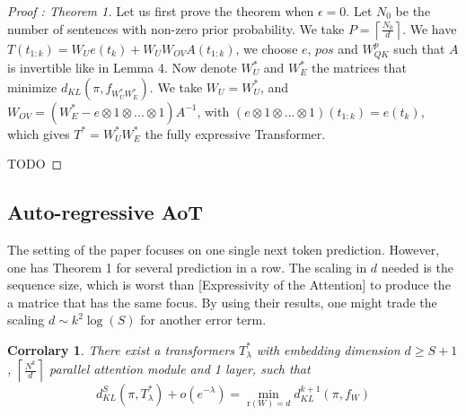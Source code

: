 \documentclass{article}
\newtheorem{corro}{Corrolary}
\begin{document}
\begin{proof}[Proof : Theorem 1]
    Let us first prove the theorem when $\epsilon = 0$. Let $N_0$ be the number of sentences with non-zero prior probability. We take $P = \left\lceil \frac{N_0}{d}\right\rceil$.
    We have $T(t_{1:k}) = W_Ue(t_k) + W_UW_{OV}A(t_{1:k})$, we choose $e$, $pos$ and $W_{QK}^p$ such that $A$ is invertible like in Lemma 4. Now denote $W_U^*$ and $W_E^*$ the 
    matrices that minimize $d_{KL}(\pi,f_{W_U^*W_E^*})$. We take $W_U = W_U^*$, and $W_{OV} = (W_E^* - e\otimes 1 \otimes ... \otimes 1)A^{-1}$, 
    with $(e\otimes 1 \otimes ... \otimes 1)(t_{1:k}) = e(t_k)$, which gives $T^* = W_U^*W_E^*$ the fully expressive Transformer.
    \bigbreak

    TODO
\end{proof}
\bigbreak

\subsection{Auto-regressive AoT}

The setting of the paper focuses on  one single next token prediction. However, one has Theorem 1 for several prediction in a row.
The scaling in $d$ needed is the sequence size, which is worst than [Expressivity of the Attention] to produce the a matrice that 
has the same focus. By using their results, one might trade the scaling $d \sim k^2\log(S)$ for another error term.
\bigbreak

\begin{corro}
    There exist a transformers $T^*_{\lambda}$ with embedding dimension $d\geq S+1$, $\left\lceil\frac{N^k}{d}\right\rceil$ parallel attention module 
    and 1 layer, such that \[d_{KL}^{S}(\pi, T^*_{\lambda}) + o(e^{-\lambda}) = \underset{\text{r}(W)=d}{\min}d_{KL}^{k+1}(\pi, f_W)\]
\end{corro}
\bigbreak
\end{document}
